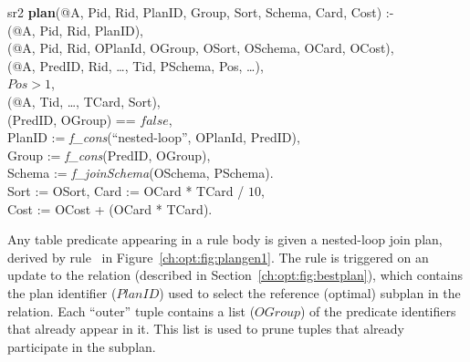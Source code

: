 \begin{figure*}
\ssp
\centering
\begin{boxedminipage}{\linewidth}
\linenumbers

sr2 {\bf plan}(@A, Pid, Rid, PlanID, Group, Sort, Schema, Card, Cost) :- \\
(@A, Pid, Rid, PlanID),\\
(@A, Pid, Rid, OPlanId, OGroup, OSort, OSchema, OCard, OCost), \\
(@A, PredID, Rid, \ldots, Tid, PSchema, Pos, \ldots), \\
\datalogspace $Pos > 1$,\\
(@A, Tid, \ldots, TCard, Sort),\\
(PredID, OGroup) == $false$,\\
\datalogspace PlanID := {\em f\_cons}(``nested-loop'', OPlanId, PredID), \\
\datalogspace Group := {\em f\_cons}(PredID, OGroup), \\
\datalogspace Schema := {\em f\_joinSchema}(OSchema, PSchema).\\
\datalogspace Sort := OSort,
\datalogspace Card := OCard * TCard / $10$,\\
\datalogspace Cost := OCost + (OCard * TCard).

\end{boxedminipage}
\caption{\label{ch:opt:fig:plangen1}nested-loop join method.}
\end{figure*}

Any table predicate appearing in a rule body is given a nested-loop join plan,
derived by rule~ in Figure~\ref{ch:opt:fig:plangen1}.  The rule is
triggered on an update to the  relation (described in
Section~\ref{ch:opt:fig:bestplan}), which contains the plan identifier
($PlanID$) used to select the reference (optimal) subplan in the 
relation.  Each ``outer''  tuple contains a list ($OGroup$) of the
predicate identifiers that already appear in it.  This list is used to prune
 tuples that already participate in the subplan.

